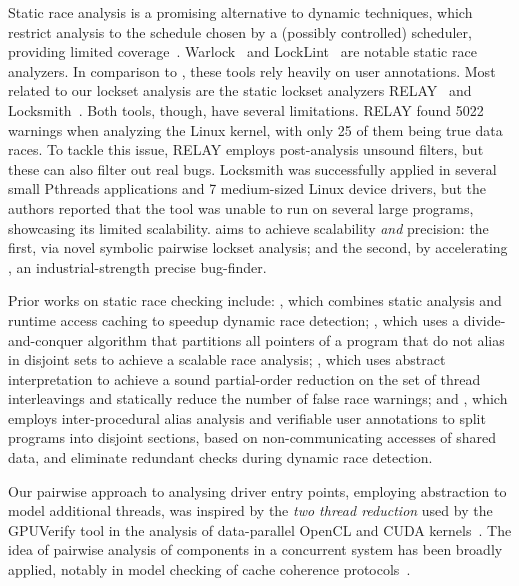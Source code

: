Static race analysis is a promising alternative to dynamic techniques, which restrict analysis to the schedule chosen by a (possibly controlled) scheduler, providing limited coverage~\cite{musuvathi2008finding}. Warlock~\cite{sterling1993warlock} and LockLint~\cite{oracle2010locklint} are notable static race analyzers.  In comparison to \whoop, these tools rely heavily on user annotations.
%
Most related to our lockset analysis are the static lockset analyzers RELAY~\cite{voung2007relay} and Locksmith~\cite{pratikakis2006locksmith}. Both tools, though, have several limitations. RELAY found 5022 warnings when analyzing the Linux kernel, with only 25 of them being true data races. To tackle this issue, RELAY employs post-analysis unsound filters, but these can also filter out real bugs. Locksmith was successfully applied in several small Pthreads applications and 7 medium-sized Linux device drivers, but the authors reported that the tool was unable to run on several large programs, showcasing its limited scalability. \whoop aims to achieve scalability \emph{and} precision: the first, via novel symbolic pairwise lockset analysis; and the second, by accelerating \corral, an industrial-strength precise bug-finder.

Prior works on static race checking include: \cite{choi2002efficient}, which combines static analysis and runtime access caching to speedup dynamic race detection; \cite{kahlon2007fast}, which uses a divide-and-conquer algorithm that partitions all pointers of a program that do not alias in disjoint sets to achieve a scalable race analysis; \cite{kahlon2009semantic}, which uses abstract interpretation to achieve a sound partial-order reduction on the set of thread interleavings and statically reduce the number of false race warnings; and \cite{das2015section}, which employs inter-procedural alias analysis and verifiable user annotations to split programs into disjoint sections, based on non-communicating accesses of shared data, and eliminate redundant checks during dynamic race detection.

Our pairwise approach to analysing driver entry points, employing abstraction to model additional threads, was inspired by the \emph{two thread reduction} used by the GPUVerify tool in the analysis of data-parallel OpenCL and CUDA kernels~\cite{gpuverify,bardsley2014engineering}.  The idea of pairwise analysis of components in a concurrent system has been broadly applied, notably in model checking of cache coherence protocols~\cite{mcmillan1999verification}.
